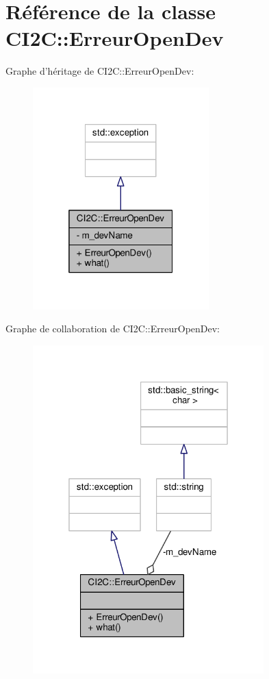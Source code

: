 \hypertarget{classCI2C_1_1ErreurOpenDev}{\section{Référence de la classe C\+I2\+C\+:\+:Erreur\+Open\+Dev}
\label{classCI2C_1_1ErreurOpenDev}
}


Graphe d'héritage de C\+I2\+C\+:\+:Erreur\+Open\+Dev\+:
\nopagebreak
\begin{figure}[H]
\begin{center}
\leavevmode
\includegraphics[width=193pt]{classCI2C_1_1ErreurOpenDev__inherit__graph}
\end{center}
\end{figure}


Graphe de collaboration de C\+I2\+C\+:\+:Erreur\+Open\+Dev\+:
\nopagebreak
\begin{figure}[H]
\begin{center}
\leavevmode
\includegraphics[width=253pt]{classCI2C_1_1ErreurOpenDev__coll__graph}
\end{center}
\end{figure}
